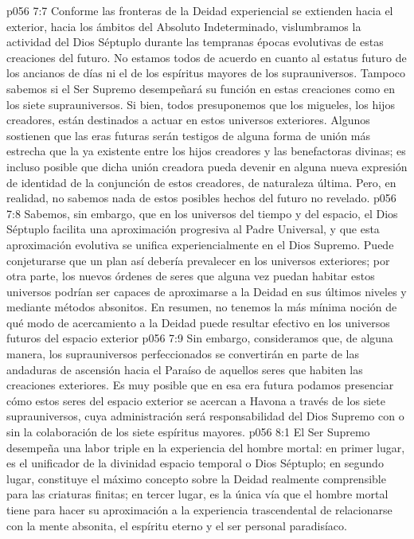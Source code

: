 \vs p056 7:7 \pc Conforme las fronteras de la Deidad experiencial se extienden hacia el exterior, hacia los ámbitos del Absoluto Indeterminado, vislumbramos la actividad del Dios Séptuplo durante las tempranas épocas evolutivas de estas creaciones del futuro. No estamos todos de acuerdo en cuanto al estatus futuro de los ancianos de días ni el de los espíritus mayores de los suprauniversos. Tampoco sabemos si el Ser Supremo desempeñará su función en estas creaciones como en los siete suprauniversos. Si bien, todos presuponemos que los migueles, los hijos creadores, están destinados a actuar en estos universos exteriores. Algunos sostienen que las eras futuras serán testigos de alguna forma de unión más estrecha que la ya existente entre los hijos creadores y las benefactoras divinas; es incluso posible que dicha unión creadora pueda devenir en alguna nueva expresión de identidad de la conjunción de estos creadores, de naturaleza última. Pero, en realidad, no sabemos nada de estos posibles hechos del futuro no revelado.
\vs p056 7:8 Sabemos, sin embargo, que en los universos del tiempo y del espacio, el Dios Séptuplo facilita una aproximación progresiva al Padre Universal, y que esta aproximación evolutiva se unifica experiencialmente en el Dios Supremo. Puede conjeturarse que un plan así debería prevalecer en los universos exteriores; por otra parte, los nuevos órdenes de seres que alguna vez puedan habitar estos universos podrían ser capaces de aproximarse a la Deidad en sus últimos niveles y mediante métodos absonitos. En resumen, no tenemos la más mínima noción de qué modo de acercamiento a la Deidad puede resultar efectivo en los universos futuros del espacio exterior
\vs p056 7:9 Sin embargo, consideramos que, de alguna manera, los suprauniversos perfeccionados se convertirán en parte de las andaduras de ascensión hacia el Paraíso de aquellos seres que habiten las creaciones exteriores. Es muy posible que en esa era futura podamos presenciar cómo estos seres del espacio exterior se acercan a Havona a través de los siete suprauniversos, cuya administración será responsabilidad del Dios Supremo con o sin la colaboración de los siete espíritus mayores.
\vs p056 8:1 El Ser Supremo desempeña una labor triple en la experiencia del hombre mortal: en primer lugar, es el unificador de la divinidad espacio temporal o Dios Séptuplo; en segundo lugar, constituye el máximo concepto sobre la Deidad realmente comprensible para las criaturas finitas; en tercer lugar, es la única vía que el hombre mortal tiene para hacer su aproximación a la experiencia trascendental de relacionarse con la mente absonita, el espíritu eterno y el ser personal paradisíaco.
